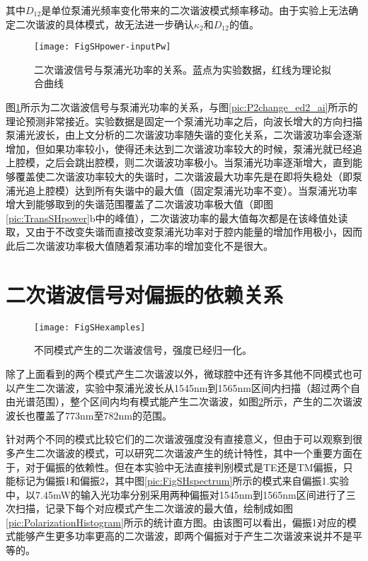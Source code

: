 其中$D_{12}$是单位泵浦光频率变化带来的二次谐波模式频率移动。由于实验上无法确定二次谐波的具体模式，故无法进一步确认$\kappa_2$和$D_{12}$的值。

\begin{figure}
\centering
\texttt{[image: FigSHpower-inputPw]}
\caption{二次谐波信号与泵浦光功率的关系。蓝点为实验数据，红线为理论拟合曲线}
\label{pic:FigSHpower-inputPw}
\end{figure}

图\ref{pic:FigSHpower-inputPw}所示为二次谐波信号与泵浦光功率的关系，与图\ref{pic:P2change_ed2_ai}所示的理论预测非常接近。实验数据是固定一个泵浦光功率之后，向波长增大的方向扫描泵浦光波长，由上文分析的二次谐波功率随失谐的变化关系，二次谐波功率会逐渐增加，但如果功率较小，使得还未达到二次谐波功率较大的时候，泵浦光就已经追上腔模，之后会跳出腔模，则二次谐波功率极小。当泵浦光功率逐渐增大，直到能够覆盖使二次谐波功率较大的失谐时，二次谐波最大功率先是在即将失稳处（即泵浦光追上腔模）达到所有失谐中的最大值（固定泵浦光功率不变）。当泵浦光功率增大到能够取到的失谐范围覆盖了二次谐波功率极大值（即图\ref{pic:TransSHpower}b中的峰值），二次谐波功率的最大值每次都是在该峰值处读取，又由于不改变失谐而直接改变泵浦光功率对于腔内能量的增加作用极小，因而此后二次谐波功率极大值随着泵浦功率的增加变化不是很大。

\section{二次谐波信号对偏振的依赖关系}

\begin{figure}
\centering
\texttt{[image: FigSHexamples]}
\caption{不同模式产生的二次谐波信号，强度已经归一化。}
\label{pic:FigSHexamples}
\end{figure}

除了上面看到的两个模式产生二次谐波以外，微球腔中还有许多其他不同模式也可以产生二次谐波，实验中泵浦光波长从1545nm到1565nm区间内扫描（超过两个自由光谱范围），整个区间内均有模式能产生二次谐波，如图\ref{pic:FigSHexamples}所示，产生的二次谐波波长也覆盖了773nm至782nm的范围。

针对两个不同的模式比较它们的二次谐波强度没有直接意义，但由于可以观察到很多产生二次谐波的模式，可以研究二次谐波产生的统计特性，其中一个重要方面在于，对于偏振的依赖性。但在本实验中无法直接判别模式是TE还是TM偏振，只能标记为偏振1和偏振2，其中图\ref{pic:FigSHspectrum}所示的模式来自偏振1.实验中，以7.45mW的输入光功率分别采用两种偏振对1545nm到1565nm区间进行了三次扫描，记录下每个对应模式产生二次谐波的最大值，绘制成如图\ref{pic:PolarizationHistogram}所示的统计直方图。由该图可以看出，偏振1对应的模式能够产生更多功率更高的二次谐波，即两个偏振对于产生二次谐波来说并不是平等的。

